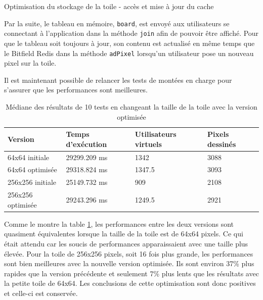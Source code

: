 \begin{listing}[H]
  \inputminted[highlightlines={9,21},linenos]{ts}{assets/figures/opti-storage-2.ts}
  \caption{Optimisation du stockage de la toile - accès et mise à jour du cache}
  \label{listing:opti-storage-2}
\end{listing}

Par la suite, le tableau en mémoire, \texttt{board}, est envoyé aux utilisateurs se connectant à l'application dans la méthode \texttt{join} afin de pouvoir être affiché. Pour que le tableau soit toujours à jour, son contenu est actualisé en même temps que le Bitfield Redis dans la méthode \texttt{adPixel} lorsqu'un utilisateur pose un nouveau pixel sur la toile.

Il est maintenant possible de relancer les tests de montées en charge pour s'assurer que les performances sont meilleures.

\begin{table}[H]
  \centering
  \begin{tabular}{|l|l|l|l|}
    \hline
    \textbf{Version}  & \textbf{Temps d'exécution} & \textbf{Utilisateurs virtuels} & \textbf{Pixels dessinés} \\ \hline
    64x64 initiale    & 29299.209 ms               & 1342                           & 3088                     \\ \hline
    64x64 optimisée   & 29318.824 ms               & 1347.5                         & 3093                     \\ \Xhline{4\arrayrulewidth}
    256x256 initiale  & 25149.732 ms               & 909                            & 2108                     \\ \hline
    256x256 optimisée & 29243.296 ms               & 1249.5                         & 2921                     \\ \hline
  \end{tabular}
  \caption{Médiane des résultats de 10 tests en changeant la taille de la toile avec la version optimisée}
  \label{table:canvas-size-results-optimized}
\end{table}

Comme le montre la table \ref{table:canvas-size-results-optimized}, les performances entre les deux versions sont quasiment équivalentes lorsque la taille de la toile est de 64x64 pixels. Ce qui était attendu car les soucis de performances apparaissaient avec une taille plus élevée. Pour la toile de 256x256 pixels, soit 16 fois plus grande, les performances sont bien meilleures avec la nouvelle version optimisée. Ils sont environ 37\% plus rapides que la version précédente et seulement 7\% plus lents que les résultats avec la petite toile de 64x64. Les conclusions de cette optimisation sont donc positives et celle-ci est conservée.


